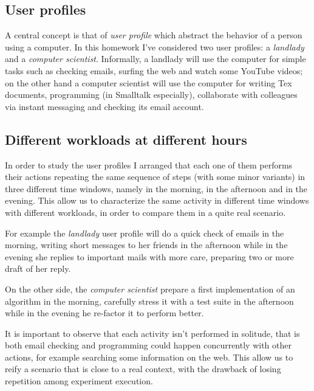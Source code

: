\documentclass[10pt,a4paper]{article}
\begin{document}
    \subsection{User profiles}
    A central concept is that of \emph{user profile} which abstract
    the behavior of a person using a computer. In this homework I've
    considered two user profiles: a \emph{landlady} and a
    \emph{computer scientist}. Informally, a landlady will use the
    computer for simple tasks such as checking emails, surfing the web
    and watch some YouTube videos; on the other hand a computer
    scientist will use the computer for writing Tex documents,
    programming (in Smalltalk especially), collaborate with colleagues
    via instant messaging and checking its email account.

    \subsection{Different workloads at different hours}
    In order to study the user profiles I arranged that each one of
    them performs their actions repeating the same sequence of steps
    (with some minor variants) in three different time windows, namely
    in the morning, in the afternoon and in the evening. This allow us
    to characterize the same activity in different time windows with
    different workloads, in order to compare them in a quite real
    scenario.

    For example the \emph{landlady} user profile will do a quick check
    of emails in the morning, writing short messages to her friends in
    the afternoon while in the evening she replies to important mails
    with more care, preparing two or more draft of her reply.

    On the other side, the \emph{computer scientist} prepare a first
    implementation of an algorithm in the morning, carefully stress it
    with a test suite in the afternoon while in the evening he re-factor
    it to perform better.

    It is important to observe that each activity isn't performed in
    solitude, that is both email checking and programming could happen
    concurrently with other actions, for example searching some
    information on the web. This allow us to reify a scenario that is
    close to a real context, with the drawback of losing repetition
    among experiment execution.
\end{document}
